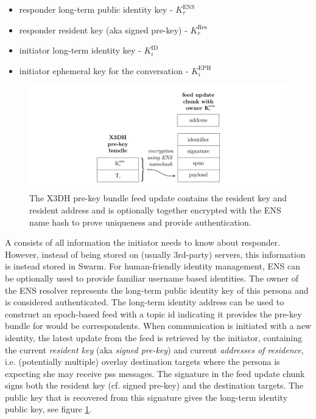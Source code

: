 \begin{itemize}
\item responder long-term public identity key - $K^{\mathrm{ENS}}_r$
\item responder resident key (aka signed pre-key) - $K^{\mathrm{Res}}_r$
\item initiator long-term identity key - $K^{\mathrm{ID}}_i$
\item initiator ephemeral key for the conversation - $K^{\mathrm{EPH}}_i$
\end{itemize}{}



\begin{figure}[htbp]
   \centering
   \includegraphics[width=\textwidth]{fig/prekey-bundle-feed-update.pdf}
   \caption[X3DH pre-key bundle feed update \statusgreen]{The X3DH pre-key bundle feed update contains the resident key and resident address and is optionally together encrypted with the ENS name hash to prove uniqueness and provide authentication.}
\label{fig:prekey-bundle-feed-update}
\end{figure}


A  consists of all information the initiator needs to know about responder. However, instead of being stored on (usually 3rd-party) servers, this information is instead stored in Swarm. For human-friendly identity management, ENS can be optionally used to provide familiar username based identities. The owner of the ENS resolver represents the long-term public identity key of this persona and is considered authenticated. The long-term identity address can be used to construct an epoch-based feed with a topic id indicating it provides the pre-key bundle for would be correspondents. When communication is initiated with a new identity, the latest update from the feed is retrieved by the initiator, containing the current \emph{resident key} (aka \emph{signed pre-key}) and current \emph{addresses of residence}, i.e. (potentially multiple) overlay destination targets where the persona is expecting she may receive pss messages. The signature in the feed update chunk signs both the resident key (cf. signed pre-key) and the destination targets. The public key that is recovered from this signature gives the long-term identity public key, see figure \ref{fig:prekey-bundle-feed-update}.


